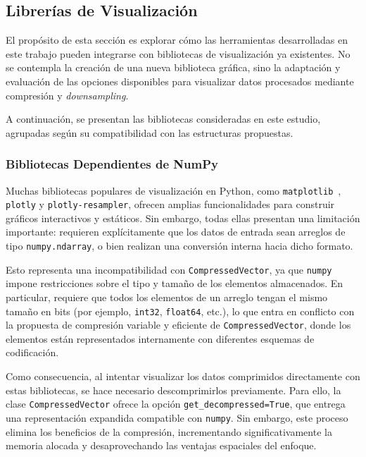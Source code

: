 \subsection{Librerías de Visualización}

El propósito de esta sección es explorar cómo las herramientas desarrolladas en este trabajo pueden integrarse con bibliotecas de visualización ya existentes. No se contempla la creación de una nueva biblioteca gráfica, sino la adaptación y evaluación de las opciones disponibles para visualizar datos procesados mediante compresión y \textit{downsampling}.

A continuación, se presentan las bibliotecas consideradas en este estudio, agrupadas según su compatibilidad con las estructuras propuestas.

\subsubsection{Bibliotecas Dependientes de NumPy}

Muchas bibliotecas populares de visualización en Python, como \texttt{matplotlib}~\cite{matplotlib}, \texttt{plotly} y \texttt{plotly-resampler}, ofrecen amplias funcionalidades para construir gráficos interactivos y estáticos. Sin embargo, todas ellas presentan una limitación importante: requieren explícitamente que los datos de entrada sean arreglos de tipo \texttt{numpy.ndarray}, o bien realizan una conversión interna hacia dicho formato.

Esto representa una incompatibilidad con \texttt{CompressedVector}, ya que \texttt{numpy} impone restricciones sobre el tipo y tamaño de los elementos almacenados. En particular, requiere que todos los elementos de un arreglo tengan el mismo tamaño en bits (por ejemplo, \texttt{int32}, \texttt{float64}, etc.), lo que entra en conflicto con la propuesta de compresión variable y eficiente de \texttt{CompressedVector}, donde los elementos están representados internamente con diferentes esquemas de codificación.

Como consecuencia, al intentar visualizar los datos comprimidos directamente con estas bibliotecas, se hace necesario descomprimirlos previamente. Para ello, la clase \texttt{CompressedVector} ofrece la opción \texttt{get\_decompressed=True}, que entrega una representación expandida compatible con \texttt{numpy}. Sin embargo, este proceso elimina los beneficios de la compresión, incrementando significativamente la memoria alocada y desaprovechando las ventajas espaciales del enfoque.

